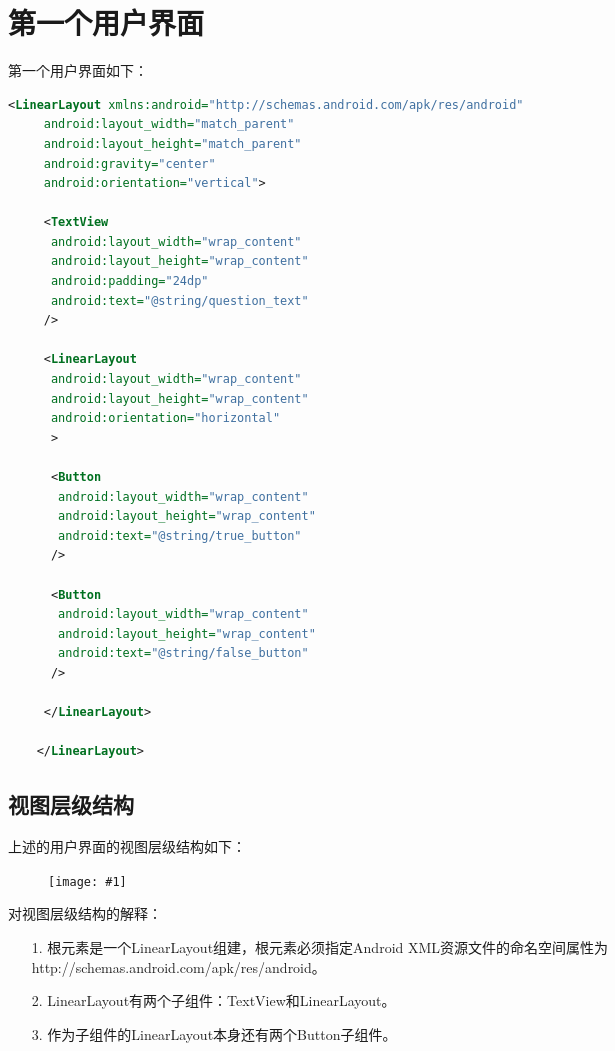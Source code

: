 \documentclass[a4paper,left=2.5cm,right=2.5cm,11pt]{article}
\newcommand{\fic}[1]{\begin{figure}[H]
		\center
		\texttt{[image: \#1]}
	\end{figure}}
\begin{document}


\section{第一个用户界面}
	第一个用户界面如下：
	\begin{lstlisting}[language = xml]
	<LinearLayout xmlns:android="http://schemas.android.com/apk/res/android"
	 android:layout_width="match_parent"
	 android:layout_height="match_parent"
	 android:gravity="center"
	 android:orientation="vertical">

	 <TextView
	  android:layout_width="wrap_content"
	  android:layout_height="wrap_content"
	  android:padding="24dp"
	  android:text="@string/question_text"
	 />

	 <LinearLayout
	  android:layout_width="wrap_content"
	  android:layout_height="wrap_content"
	  android:orientation="horizontal"
	  >

	  <Button
	   android:layout_width="wrap_content"
	   android:layout_height="wrap_content"
	   android:text="@string/true_button"
	  />

	  <Button
	   android:layout_width="wrap_content"
	   android:layout_height="wrap_content"
	   android:text="@string/false_button"
	  />

	 </LinearLayout>

	</LinearLayout>
	\end{lstlisting}

\subsection{视图层级结构}
	上述的用户界面的视图层级结构如下：
	\fic{1.png}

	对视图层级结构的解释：
	\begin{itemize}
		\item[1.] 根元素是一个LinearLayout组建，根元素必须指定Android XML资源文件的命名空间属性为http://schemas.android.com/apk/res/android。
		\item[2.] LinearLayout有两个子组件：TextView和LinearLayout。
		\item[3.] 作为子组件的LinearLayout本身还有两个Button子组件。
	\end{itemize}
\end{document}

